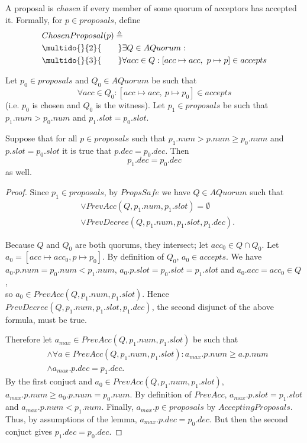 \documentclass[12pt,a4paper,en]{pracamgr}
\newcommand{\ti}[1]{\textit{#1}}
\newcommand{\ind}[1]{\multido{}{#1}{\qquad}}
\begin{document}
A proposal is \ti{chosen} if every member of some quorum of acceptors has accepted it. Formally, for $p \in proposals$, define
\begin{align*}
    & ChosenProposal(p) \triangleq\\
    & \ind{2} \exists Q \in AQuorum:\\
    & \ind{3} \forall acc \in Q: [acc \mapsto acc,\ p \mapsto p] \in accepts
\end{align*}

\begin{lemma}\label{paxos-main-lemma}
    Let $p_0 \in proposals$ and $Q_0 \in AQuorum$ be such that
    $$ \forall acc \in Q_0: [acc \mapsto acc,\ p \mapsto p_0] \in accepts $$
    (i.e. $p_0$ is chosen and $Q_0$ is the witness). Let $p_1 \in proposals$ be such that $p_1.num > p_0.num$ and $p_1.slot = p_0.slot$.

    Suppose that for all $p \in proposals$ such that $p_1.num > p.num \ge p_0.num$ and $p.slot = p_0.slot$ it is true that $p.dec = p_0.dec$. Then
    $$p_1.dec = p_0.dec$$
    as well.
\end{lemma}
\begin{proof}
    Since $p_1 \in proposals$, by $PropsSafe$ we have $Q \in AQuorum$ such that
    \begin{align*}
        & \lor PrevAcc(Q, p_1.num, p_1.slot) = \emptyset\\
        & \lor PrevDecree(Q, p_1.num, p_1.slot, p_1.dec).
    \end{align*}

    Because $Q$ and $Q_0$ are both quorums, they intersect; let $acc_0 \in Q \cap Q_0$. Let $a_0 = [acc \mapsto acc_0, p \mapsto p_0]$. By definition of $Q_0$, $a_0 \in accepts$. We have $a_0.p.num = p_0.num < p_1.num$, $a_0.p.slot = p_0.slot = p_1.slot$ and $a_0.acc = acc_0 \in Q$,\\
    so $a_0 \in PrevAcc(Q, p_1.num, p_1.slot)$. Hence $PrevDecree(Q, p_1.num, p_1.slot, p_1.dec)$, the second disjunct of the above formula, must be true.

    Therefore let $a_{max} \in PrevAcc(Q, p_1.num, p_1.slot)$ be such that
    \begin{align*}
        & \land \forall a \in PrevAcc(Q, p_1.num, p_1.slot): a_{max}.p.num \ge a.p.num\\
        & \land a_{max}.p.dec = p_1.dec.
    \end{align*}
    By the first conjuct and $a_0 \in PrevAcc(Q, p_1.num, p_1.slot)$, $a_{max}.p.num \ge a_0.p.num = p_0.num$. By definition of $PrevAcc$, $a_{max}.p.slot = p_1.slot$ and $a_{max}.p.num < p_1.num$. Finally, $a_{max}.p \in proposals$ by $AcceptingProposals$. Thus, by assumptions of the lemma, $a_{max}.p.dec = p_0.dec$. But then the second conjuct gives $p_1.dec = p_0.dec$.
\end{proof}
\end{document}
